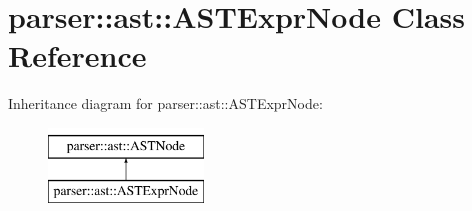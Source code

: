\hypertarget{classparser_1_1ast_1_1ASTExprNode}{}\section{parser\+:\+:ast\+:\+:A\+S\+T\+Expr\+Node Class Reference}
\label{classparser_1_1ast_1_1ASTExprNode}
Inheritance diagram for parser\+:\+:ast\+:\+:A\+S\+T\+Expr\+Node\+:\begin{figure}[H]
\begin{center}
\leavevmode
\includegraphics[height=2.000000cm]{db/dc8/classparser_1_1ast_1_1ASTExprNode}
\end{center}
\end{figure}

